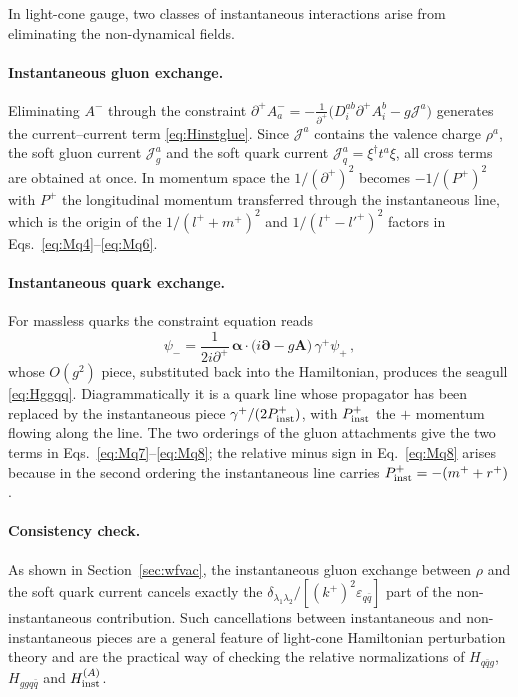 \documentclass[11pt]{article}
\newcommand{\eps}{\varepsilon}
\newcommand{\dg}{\dagger}
\newcommand{\Hqqg}{H_{q\bar q g}}
\newcommand{\Hggqq}{H_{ggq\bar q}}
\begin{document}
In light-cone gauge, two classes of instantaneous interactions arise from eliminating the
non-dynamical fields.

\paragraph{Instantaneous gluon exchange.} Eliminating $A^-$ through the constraint
$\partial^+A^-_a=-\frac{1}{\partial^+}\big(D^{ab}_i\partial^+A^b_i-g\mathcal J^{a}\big)$ generates
the current--current term \eqref{eq:Hinstglue}. Since $\mathcal J^a$ contains the valence charge
$\rho^a$, the soft gluon current $\mathcal J_g^a$ and the soft quark current
$\mathcal J^a_q=\xi^\dg t^a\xi$, all cross terms are obtained at once. In momentum space the
$1/(\partial^+)^2$ becomes $-1/(P^+)^2$ with $P^+$ the longitudinal momentum transferred through
the instantaneous line, which is the origin of the $1/(l^++m^+)^2$ and $1/(l^+-l'^+)^2$ factors in
Eqs.~\eqref{eq:Mq4}--\eqref{eq:Mq6}.

\paragraph{Instantaneous quark exchange.} For massless quarks the constraint equation reads
\begin{equation}
\psi_-=\frac{1}{2i\partial^+}\,\bm\alpha\!\cdot\!\big(i\bm\partial-g\bm A\big)\,\gamma^+\psi_+\,,
\end{equation}
whose $O(g^2)$ piece, substituted back into the Hamiltonian, produces the seagull
\eqref{eq:Hggqq}. Diagrammatically it is a quark line whose propagator has been replaced by the
instantaneous piece $\gamma^+/(2P^+_{\rm inst})$, with $P^+_{\rm inst}$ the $+$ momentum flowing
along the line. The two orderings of the gluon attachments give the two terms in
Eqs.~\eqref{eq:Mq7}--\eqref{eq:Mq8}; the relative minus sign in Eq.~\eqref{eq:Mq8} arises because
in the second ordering the instantaneous line carries $P^+_{\rm inst}=-(m^++r^+)$.

\paragraph{Consistency check.} As shown in Section~\ref{sec:wfvac}, the instantaneous gluon
exchange between $\rho$ and the soft quark current cancels exactly the
$\delta_{\lambda_1\lambda_2}/[(k^+)^2\eps_{q\bar q}]$ part of the non-instantaneous contribution.
Such cancellations between instantaneous and non-instantaneous pieces are a general feature of
light-cone Hamiltonian perturbation theory and are the practical way of checking the relative
normalizations of $\Hqqg$, $\Hggqq$ and $H^{(A)}_{\rm inst}$.
\end{document}

